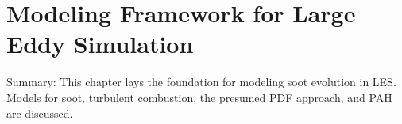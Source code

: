 \chapter{Modeling Framework for Large Eddy Simulation\label{ch:lesmodels}}

Summary: This chapter lays the foundation for modeling soot evolution in LES. Models for soot, turbulent combustion, the presumed PDF approach, and PAH are discussed.





